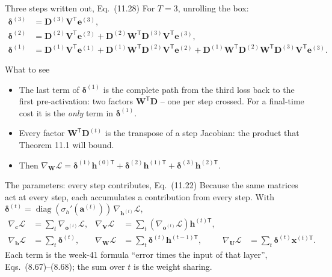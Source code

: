 \documentclass[10pt,aspectratio=169]{beamer}
\begin{document}
\begin{frame}{Three steps written out, Eq.~(11.28)}
For $T=3$, unrolling the box:
\[
\begin{aligned}
  \bm{\delta}^{(3)}&=\bm{D}^{(3)}\bm{V}^{\mathsf{T}}\bm{e}^{(3)},\\
  \bm{\delta}^{(2)}&=\bm{D}^{(2)}\bm{V}^{\mathsf{T}}\bm{e}^{(2)}
                    +\bm{D}^{(2)}\bm{W}^{\mathsf{T}}\bm{D}^{(3)}\bm{V}^{\mathsf{T}}\bm{e}^{(3)},\\
  \bm{\delta}^{(1)}&=\bm{D}^{(1)}\bm{V}^{\mathsf{T}}\bm{e}^{(1)}
                    +\bm{D}^{(1)}\bm{W}^{\mathsf{T}}\bm{D}^{(2)}\bm{V}^{\mathsf{T}}\bm{e}^{(2)}
                    +\bm{D}^{(1)}\bm{W}^{\mathsf{T}}\bm{D}^{(2)}\bm{W}^{\mathsf{T}}\bm{D}^{(3)}\bm{V}^{\mathsf{T}}\bm{e}^{(3)}.
\end{aligned}
\]
\begin{block}{What to see}
\begin{itemize}
  \item The last term of $\bm{\delta}^{(1)}$ is the complete path from the
        third loss back to the first pre-activation: two factors
        $\bm{W}^{\mathsf{T}}\bm{D}$ -- one per step crossed.  For a
        final-time cost it is the \emph{only} term in $\bm{\delta}^{(1)}$.
  \item Every factor $\bm{W}^{\mathsf{T}}\bm{D}^{(t)}$ is the transpose of a
        step Jacobian: the product that Theorem 11.1 will bound.
  \item Then $\nabla_{\bm{W}}\mathcal{L}=\bm{\delta}^{(1)}\bm{h}^{(0)\mathsf{T}}
        +\bm{\delta}^{(2)}\bm{h}^{(1)\mathsf{T}}+\bm{\delta}^{(3)}\bm{h}^{(2)\mathsf{T}}$.
\end{itemize}
\end{block}
\end{frame}


\begin{frame}{The parameters: every step contributes, Eq.~(11.22)}
Because the same matrices act at every step, each accumulates a contribution
from every step.  With
$\bm{\delta}^{(t)}=\operatorname{diag}(\sigma_h'(\bm{a}^{(t)}))\,\nabla_{\bm{h}^{(t)}}\mathcal{L}$,
\[
\begin{aligned}
  \nabla_{\bm{c}}\mathcal{L}&=\sum_t\nabla_{\bm{o}^{(t)}}\mathcal{L}, &
  \nabla_{\bm{V}}\mathcal{L}&=\sum_t\left(\nabla_{\bm{o}^{(t)}}\mathcal{L}\right)\bm{h}^{(t)\mathsf{T}},\\
  \nabla_{\bm{b}}\mathcal{L}&=\sum_t\bm{\delta}^{(t)}, &
  \nabla_{\bm{W}}\mathcal{L}&=\sum_t\bm{\delta}^{(t)}\bm{h}^{(t-1)\mathsf{T}}, &
  \nabla_{\bm{U}}\mathcal{L}&=\sum_t\bm{\delta}^{(t)}\bm{x}^{(t)\mathsf{T}}.
\end{aligned}
\]
Each term is the week-41 formula ``error times the input of that layer'',
Eqs.~(8.67)--(8.68); the sum over $t$ is the weight sharing.
\end{frame}
\end{document}
